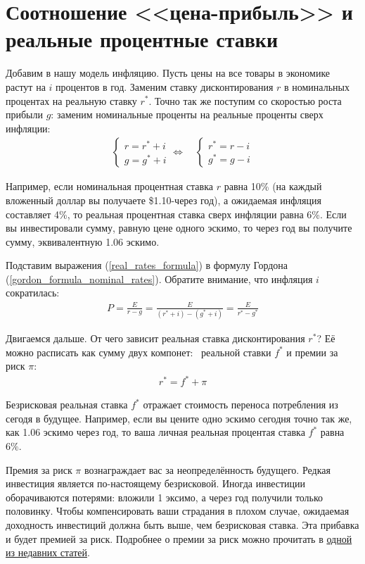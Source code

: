 \section{Соотношение <<цена-прибыль>> и реальные процентные ставки}

Добавим в нашу модель инфляцию. Пусть цены на все товары в экономике растут на $i$ процентов в год. Заменим ставку дисконтирования $r$ в номинальных процентах на реальную ставку $r^*$. Точно так же поступим со скоростью роста прибыли $g$: заменим номинальные проценты на реальные проценты сверх инфляции:
\begin{align}
\begin{cases}
r = r^* + i \\
g = g^* + i
\end{cases}
\Leftrightarrow
\quad
\begin{cases}
r^* = r - i \\
g^* = g - i
\end{cases}
\label{real_rates_formula}
\end{align}

Например, если номинальная процентная ставка $r$ равна 10\% (на каждый вложенный доллар вы получаете \$1.10-через год), а ожидаемая инфляция составляет 4\%, то реальная процентная ставка сверх инфляции равна 6\%. Если вы инвестировали сумму, равную цене одного эскимо, то через год вы получите сумму, эквивалентную 1.06 эскимо.

Подставим выражения (\ref{real_rates_formula}) в формулу Гордона  (\ref{gordon_formula_nominal_rates}). Обратите внимание, что инфляция $i$ сократилась:
\begin{align}
P = \frac{E}{r - g} = \frac{E}{(r^* + i) - (g^* + i)} =  \frac{E}{r^* - g^*} 
\label{gordon_formula_real_rates}
\end{align}

Двигаемся дальше. От чего зависит реальная ставка дисконтирования $r^*$? Её можно расписать как сумму двух компонет: \ реальной ставки $f^*$ и премии за риск $\pi$:
\begin{align}
r^* = f^* + \pi
\label{risk_premium_formula}
\end{align}

Безрисковая реальная ставка $f^*$ отражает стоимость переноса потребления из сегодя в будущее. Например, если вы цените одно эскимо сегодня точно так же, как 1.06 эскимо через год, то ваша личная реальная процентая ставка $f^*$ равна $6\%$.

Премия за риск $\pi$ вознаграждает вас за неопределённость будущего. Редкая инвестиция является по-настоящему безрисковой. Иногда инвестиции оборачиваются потерями: вложили 1 эксимо, а через год получили только половинку. Чтобы компенсировать ваши страдания в плохом случае, ожидаемая доходность инвестиций должна быть выше, чем безрисковая ставка. Эта прибавка и будет премией за риск. Подробнее о премии за риск можно прочитать в \href{https://habr.com/ru/company/dbtc/blog/527050/}{одной из недавних статей}.

